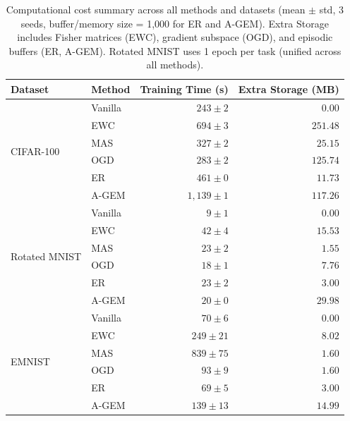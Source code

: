 
\begin{table}[htbp]
\centering
\caption{Computational cost summary across all methods and datasets
         (mean $\pm$ std, 3 seeds, buffer/memory size = 1{,}000 for ER and A-GEM).
         Extra Storage includes Fisher matrices (EWC), gradient subspace (OGD),
         and episodic buffers (ER, A-GEM).
         Rotated MNIST uses 1 epoch per task (unified across all methods).}
\label{tab:cost_summary}
\small
\begin{tabular}{llrr}
\toprule
\textbf{Dataset} & \textbf{Method} &
\textbf{Training Time (s)} &
\textbf{Extra Storage (MB)} \\
\midrule

\multirow{6}{*}{CIFAR-100}
 & Vanilla  & $243 \pm 2$      & $0.00$    \\
 & EWC      & $694 \pm 3$      & $251.48$  \\
 & MAS      & $327 \pm 2$      & $25.15$   \\
 & OGD      & $283 \pm 2$      & $125.74$  \\
 & ER       & $461 \pm 0$      & $11.73$   \\
 & A-GEM    & $1{,}139 \pm 1$  & $117.26$  \\
\midrule

\multirow{6}{*}{Rotated MNIST}
 & Vanilla  & $9 \pm 1$  & $0.00$  \\
 & EWC      & $42 \pm 4$ & $15.53$ \\
 & MAS      & $23 \pm 2$ & $1.55$  \\
 & OGD      & $18 \pm 1$ & $7.76$  \\
 & ER       & $23 \pm 2$ & $3.00$  \\
 & A-GEM    & $20 \pm 0$ & $29.98$ \\
\midrule

\multirow{6}{*}{EMNIST}
 & Vanilla  & $70 \pm 6$         & $0.00$  \\
 & EWC      & $249 \pm 21$       & $8.02$  \\
 & MAS      & $839 \pm 75$       & $1.60$  \\
 & OGD      & $93 \pm 9$         & $1.60$  \\
 & ER       & $69 \pm 5$         & $3.00$  \\
 & A-GEM    & $139 \pm 13$       & $14.99$ \\
\bottomrule
\end{tabular}
\end{table}
